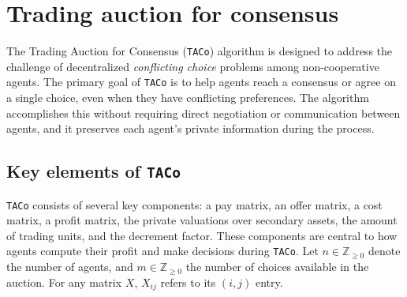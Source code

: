 \section{Trading auction for consensus}

The Trading Auction for Consensus (\texttt{TACo}) algorithm is designed to address the challenge of decentralized \emph{conflicting choice} problems among non-cooperative agents. The primary goal of \texttt{TACo} is to help agents reach a consensus or agree on a single choice, even when they have conflicting preferences. The algorithm accomplishes this without requiring direct negotiation or communication between agents, and it preserves each agent's private information during the process.

\subsection{Key elements of \texttt{TACo}}

\texttt{TACo} consists of several key components: a pay matrix, an offer matrix, a cost matrix, a profit matrix, the private valuations over secondary assets, the amount of trading units, and the decrement factor. These components are central to how agents compute their profit and make decisions during \texttt{TACo}. Let $n \in \mathbb{Z}_{\geq0}$ denote the number of agents, and $m \in \mathbb{Z}_{\geq0}$ the number of choices available in the auction. For any matrix $X$, $X_{ij}$ refers to its $(i,j)$ entry.

